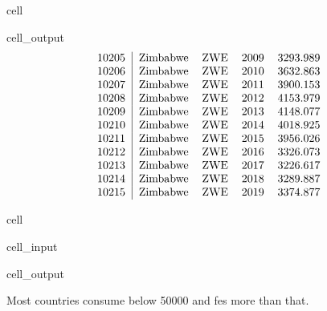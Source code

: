 \documentclass[letterpaper,10pt,english]{jupyterBook}
\begin{document}
\begin{sphinxuseclass}{cell}
\begin{sphinxVerbatimOutput}
\begin{sphinxuseclass}{cell_output}
\begin{equation*}
\begin{split}
\begin{tabular}{r|llll}
	10205 & Zimbabwe & ZWE & 2009 & 3293.989\\
	10206 & Zimbabwe & ZWE & 2010 & 3632.863\\
	10207 & Zimbabwe & ZWE & 2011 & 3900.153\\
	10208 & Zimbabwe & ZWE & 2012 & 4153.979\\
	10209 & Zimbabwe & ZWE & 2013 & 4148.077\\
	10210 & Zimbabwe & ZWE & 2014 & 4018.925\\
	10211 & Zimbabwe & ZWE & 2015 & 3956.026\\
	10212 & Zimbabwe & ZWE & 2016 & 3326.073\\
	10213 & Zimbabwe & ZWE & 2017 & 3226.617\\
	10214 & Zimbabwe & ZWE & 2018 & 3289.887\\
	10215 & Zimbabwe & ZWE & 2019 & 3374.877\\
\end{tabular}\end{split}
\end{equation*}
\end{sphinxuseclass}\end{sphinxVerbatimOutput}

\end{sphinxuseclass}
\begin{sphinxuseclass}{cell}\begin{sphinxVerbatimInput}

\begin{sphinxuseclass}{cell_input}
\begin{sphinxVerbatim}[commandchars=\\\{\}]
\end{sphinxVerbatim}

\end{sphinxuseclass}\end{sphinxVerbatimInput}
\begin{sphinxVerbatimOutput}

\begin{sphinxuseclass}{cell_output}
\noindent{}

\end{sphinxuseclass}\end{sphinxVerbatimOutput}

\end{sphinxuseclass}
\sphinxAtStartPar
Most countries consume below 50000 and fes more than that.
\end{document}
